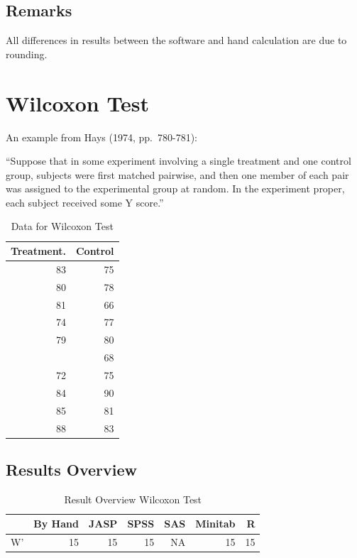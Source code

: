 \documentclass[
]{book}
\begin{document}
\hypertarget{remarks-2}{%
\subsection{Remarks}\label{remarks-2}}

All differences in results between the software and hand calculation are due to rounding.

\hypertarget{wilcoxon-test}{%
\section{Wilcoxon Test}\label{wilcoxon-test}}

An example from Hays (1974, pp.~780-781):

``Suppose that in some experiment involving a single treatment and one control group, subjects were first matched pairwise, and then one member of each pair was assigned to the experimental group at random. In the experiment proper, each subject received some Y score.''

\begin{table}

\caption{\label{tab:unnamed-chunk-27}Data for Wilcoxon Test}
\centering
\begin{tabular}[t]{rr}
\toprule
Treatment. & Control\\
\midrule
83 & 75\\
80 & 78\\
81 & 66\\
74 & 77\\
79 & 80\\
\addlinespace
78 & 68\\
72 & 75\\
84 & 90\\
85 & 81\\
88 & 83\\
\bottomrule
\end{tabular}
\end{table}

\hypertarget{results-overview-3}{%
\subsection{Results Overview}\label{results-overview-3}}

\begin{table}

\caption{\label{tab:unnamed-chunk-28}Result Overview Wilcoxon Test}
\centering
\begin{tabular}[t]{lrrrrrr}
\toprule
  & By Hand & JASP & SPSS & SAS & Minitab & R\\
\midrule
W' & 15 & 15 & 15 & NA & 15 & 15\\
\bottomrule
\end{tabular}
\end{table}
\end{document}
